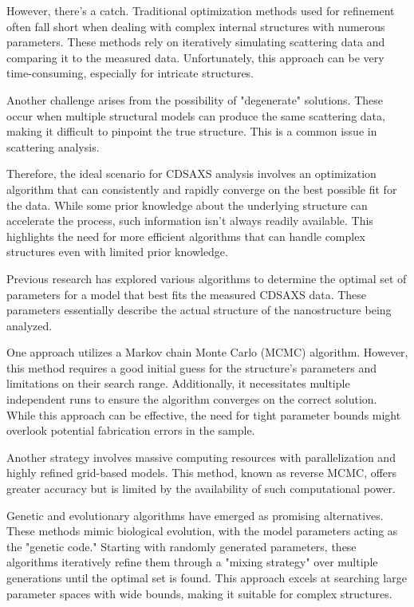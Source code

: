 \medskip

However, there's a catch. Traditional optimization methods used for refinement often fall short when dealing with complex internal structures with numerous parameters. These methods rely on iteratively simulating scattering data and comparing it to the measured data. Unfortunately, this approach can be very time-consuming, especially for intricate structures.

\medskip

Another challenge arises from the possibility of "degenerate" solutions. These occur when multiple structural models can produce the same scattering data, making it difficult to pinpoint the true structure. This is a common issue in scattering analysis.

\medskip

Therefore, the ideal scenario for CDSAXS analysis involves an optimization algorithm that can consistently and rapidly converge on the best possible fit for the data. While some prior knowledge about the underlying structure can accelerate the process, such information isn't always readily available. This highlights the need for more efficient algorithms that can handle complex structures even with limited prior knowledge.

\medskip

Previous research has explored various algorithms to determine the optimal set of parameters for a model that best fits the measured CDSAXS data. These parameters essentially describe the actual structure of the nanostructure being analyzed.

\medskip

One approach utilizes a Markov chain Monte Carlo (MCMC) algorithm. However, this method requires a good initial guess for the structure's parameters and limitations on their search range. Additionally, it necessitates multiple independent runs to ensure the algorithm converges on the correct solution. While this approach can be effective, the need for tight parameter bounds might overlook potential fabrication errors in the sample.

\medskip

Another strategy involves massive computing resources with parallelization and highly refined grid-based models. This method, known as reverse MCMC, offers greater accuracy but is limited by the availability of such computational power.

\medskip

Genetic and evolutionary algorithms have emerged as promising alternatives. These methods mimic biological evolution, with the model parameters acting as the "genetic code." Starting with randomly generated parameters, these algorithms iteratively refine them through a "mixing strategy" over multiple generations until the optimal set is found. This approach excels at searching large parameter spaces with wide bounds, making it suitable for complex structures.
\cite{hannon2016advancing}
